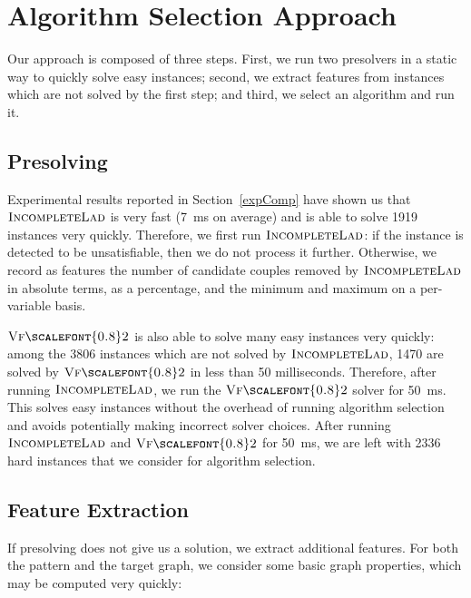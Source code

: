\documentclass{llncs}
\newcommand{\VFtwo}{$\textsc{Vf{\scalefont{0.8}2}}$\xspace}
\newcommand{\IncompleteLAD}{$\textsc{IncompleteLad}$\xspace}
\begin{document}
\section{Algorithm Selection Approach}

Our approach is composed of three steps. First, we run two presolvers in a static way to quickly
solve easy instances; second, we extract features from instances which are not solved by the first
step; and third, we select an algorithm and run it.

\subsection{Presolving}

Experimental results reported in Section~\ref{expComp} have shown us that \IncompleteLAD is very fast
(\SI{7}{\ms} on average) and is able to solve 1919 instances very quickly. Therefore, we first run
\IncompleteLAD: if the instance is detected to be unsatisfiable, then we do not process it further.
Otherwise, we record as features the number of candidate couples removed by \IncompleteLAD in absolute
terms, as a percentage, and the minimum and maximum on a per-variable basis.

\VFtwo is also able to solve many easy instances very quickly: among the 3806 instances which are not
solved by \IncompleteLAD, 1470 are solved by \VFtwo in less than 50 milliseconds. Therefore, after
running \IncompleteLAD, we run the \VFtwo solver for \SI{50}{\ms}. This solves easy instances without
the overhead of running algorithm selection and avoids potentially making incorrect solver choices.
After running \IncompleteLAD and \VFtwo for \SI{50}{\ms}, we are left with 2336 hard instances that we
consider for algorithm selection.

\subsection{Feature Extraction}

If presolving does not give us a solution, we extract additional features. For both the pattern and
the target graph, we consider some basic graph properties, which may be computed very quickly:
\end{document}
